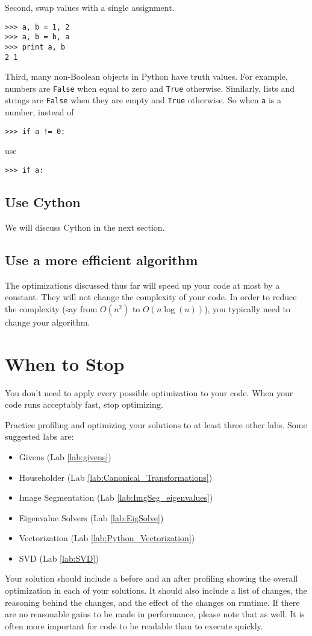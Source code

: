 Second, swap values with a single assignment.
\begin{lstlisting}
>>> a, b = 1, 2
>>> a, b = b, a
>>> print a, b
2 1
\end{lstlisting}

Third, many non-Boolean objects in Python have truth values.
For example, numbers are \texttt{False} when equal to zero and \texttt{True} otherwise.
Similarly, lists and strings are \texttt{False} when they are empty and \texttt{True} otherwise.
So when \texttt{a} is a number, instead of
\begin{lstlisting}
>>> if a != 0:
\end{lstlisting}
use
\begin{lstlisting}
>>> if a:
\end{lstlisting}
\subsection*{Use Cython}
We will discuss Cython in the next section.

\subsection*{Use a more efficient algorithm}
The optimizations discussed thus far will speed up your code at most by a constant.
They will not change the complexity of your code.
In order to reduce the complexity (say from $O(n^2)$ to $O(n \log(n))$), you typically need to change your algorithm.









\section*{When to Stop}
You don't need to apply every possible optimization to your code.
When your code runs acceptably fast, stop optimizing.

\begin{problem}
Practice profiling and optimizing your solutions to at least three other labs.
Some suggested labs are:
\begin{itemize}
\item Givens (Lab \ref{lab:givens})
\item Householder (Lab \ref{lab:Canonical_Transformations})
\item Image Segmentation (Lab \ref{lab:ImgSeg_eigenvalues})
\item Eigenvalue Solvers (Lab \ref{lab:EigSolve})
\item Vectorization (Lab \ref{lab:Python_Vectorization})
\item SVD (Lab \ref{lab:SVD})
\end{itemize}
Your solution should include a before and an after profiling showing the overall optimization in each of your solutions.  It should also include a list of changes, the reasoning behind the changes, and the effect of the changes on runtime.  If there are no reasonable gains to be made in performance, please note that as well.  It is often more important for code to be readable than to execute quickly.
\end{problem}

